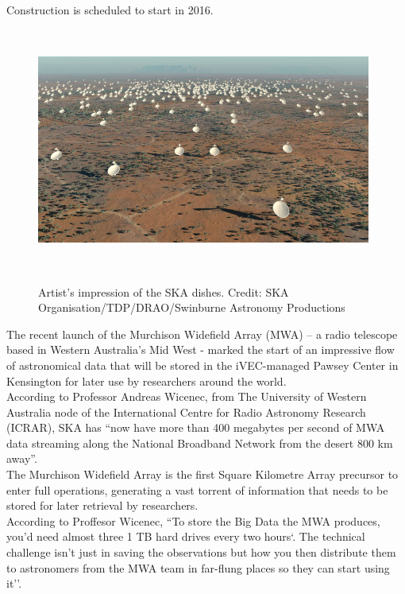 Construction is scheduled to start in 2016.\\

\begin{figure}[H]
\centering
\includegraphics[width=11cm,height=8cm]{images/ska.jpg}\\
\caption{Artist's impression of the SKA dishes. Credit: SKA Organisation/TDP/DRAO/Swinburne Astronomy Productions}
\end{figure}


The recent launch of the Murchison Widefield Array (MWA) – a radio telescope based in Western Australia's Mid West - marked the start of an impressive flow of astronomical data that will be stored in the iVEC-managed Pawsey Center in Kensington for later use by researchers around the world.\\

According to Professor Andreas Wicenec, from The University of Western Australia node of the International Centre for Radio Astronomy Research (ICRAR), SKA has ``now have more than 400 megabytes per second of MWA data streaming along the National Broadband Network from the desert 800 km away''.\\

The Murchison Widefield Array is the first Square Kilometre Array precursor to enter full operations, generating a vast torrent of information that needs to be stored for later retrieval by researchers.\\

According to Proffesor Wicenec, ``To store the Big Data the MWA produces, you’d need almost three 1 TB hard drives every two hours`. The technical challenge isn’t just in saving the observations but how you then distribute them to astronomers from the MWA team in far-flung places so they can start using it''.\\

